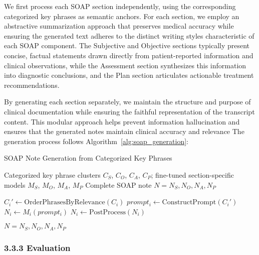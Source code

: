 \documentclass[11pt,a4paper]{article}
\begin{document}
We first process each SOAP section independently, using the corresponding categorized key phrases as semantic anchors. For each section, we employ an abstractive summarization approach that preserves medical accuracy while ensuring the generated text adheres to the distinct writing styles characteristic of each SOAP component. The Subjective and Objective sections typically present concise, factual statements drawn directly from patient-reported information and clinical observations, while the Assessment section synthesizes this information into diagnostic conclusions, and the Plan section articulates actionable treatment recommendations.

By generating each section separately, we maintain the structure and purpose of clinical documentation while ensuring the faithful representation of the transcript content. This modular approach helps prevent information hallucination and ensures that the generated notes maintain clinical accuracy and relevance
The generation process follows Algorithm~\ref{alg:soap_generation}:

\begin{algorithm}[H]
    \caption{SOAP Note Generation from Categorized Key Phrases}
    \label{alg:soap_generation}
    \begin{algorithmic}
        \REQUIRE Categorized key phrase clusters $C_S$, $C_O$, $C_A$, $C_P$; fine-tuned section-specific models $M_S$, $M_O$, $M_A$, $M_P$
        \ENSURE Complete SOAP note $N = {N_S, N_O, N_A, N_P}$

            \STATE $C_i' \gets \text{OrderPhrasesByRelevance}(C_i)$ 
            \STATE $prompt_i \gets \text{ConstructPrompt}(C_i')$ 
            \STATE $N_i \gets M_i(prompt_i)$ 
            \STATE $N_i \gets \text{PostProcess}(N_i)$ 
        \ENDFOR

        \STATE \RETURN $N = {N_S, N_O, N_A, N_P}$
    \end{algorithmic}
\end{algorithm}

\subsubsection*{3.3.3 Evaluation}
\end{document}
